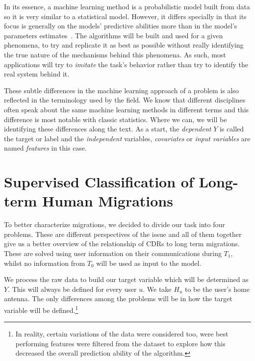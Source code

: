 In its essence, a machine learning method is a probabilistic model built from data so it is very similar to a statistical model. However, it differs specially in that its focus is generally on the models' predictive abilities more than in the model's parameters estimates~\textcite{breiman-statisticalmodeling}. The algorithms will be built and used for a given phenomena, to try and replicate it as best as possible without really identifying the true nature of the mechanisms behind this phenomena. As such, most applications will try to \textit{imitate} the task's behavior rather than try to identify the real system behind it.


These subtle differences in the machine learning approach of a problem is also reflected in the terminology used by the field. We know that different disciplines often speak about the same machine learning methods in different terms and this difference is most notable with classic statistics. Where we can, we will be identifying these differences along the text. As a start, the \textit{dependent} $Y$ is called the target or label and the \textit{independent} variables, \textit{covariates} or \textit{input variables} are named \textit{features} in this case.

\section{Supervised Classification of Long-term Human Migrations}\label{long_term}

To better characterize migrations, we decided to divide our task into four problems. These are different perspectives of the issue and all of them together give us a better overview of the relationship of CDRs to long term migrations. These are solved using user information on their communications during $T_1$, whilst no information from $T_0$ will be used as input to the model.

We process the raw data to build our target variable which will be determined as $Y$. This will always be defined for every user $u$. We take $H_u$ to be the user's home antenna. The only differences among the problems will be in how the target variable will be defined.\footnote{In reality, certain variations of the data were considered too, were best performing features were filtered from the dataset to explore how this decreased the overall prediction ability of the algorithm.}



